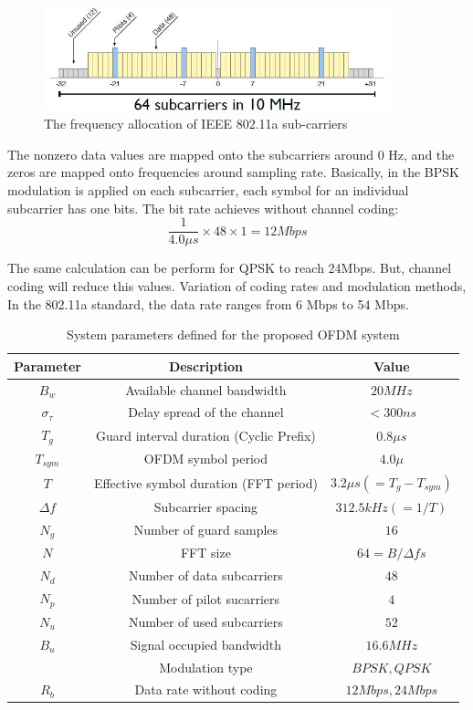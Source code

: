 \begin{figure}[h!]
\centering
\includegraphics[width=10cm]{content/fig/freq_alloc.JPG}
\caption{The frequency allocation of IEEE 802.11a sub-carriers}
\label{fig:freq_alloc}
\end{figure}

The nonzero data values are mapped onto the subcarriers around 0 Hz, and the zeros are mapped onto frequencies around sampling rate.
Basically, in the BPSK modulation is applied on each subcarrier, each symbol for an individual subcarrier has one bits. The bit rate achieves without channel coding:\\

\begin{equation} \label{bitrate_achiv}
\frac{1}{4.0\mu s} \times 48 \times 1= 12Mbps
\end{equation}

The same calculation can be perform for QPSK to reach 24Mbps. But, channel coding will reduce this values. Variation of coding rates and modulation methods, In the 802.11a standard, the data rate ranges from 6 Mbps to 54 Mbps.\\

\begin{table}
\centering
\vspace{0.5cm}
\begin{tabular}{c|c|c}
Parameter&Description&Value\\ \hline
$B_{w}$&Available channel bandwidth&$20MHz$\\
$\sigma_{\tau}$&Delay spread of the channel& $<300 ns$\\
$T_{g}$&Guard interval duration (Cyclic Prefix)&$0.8\mu s$\\
$T_{sym}$&OFDM symbol period&$4.0\mu$\\
$T$&Effective symbol duration (FFT period)&$3.2\mu s (=T_{g}- T_{sym})$\\
$\Delta f$&Subcarrier spacing&$312.5kHz (=1/T)$\\
$N_{g}$&Number of guard samples&$16$\\
$N$&FFT size&$64= B/\Delta f s$\\
$N_{d}$&Number of data subcarriers&$48$\\
$N_{p}$&Number of pilot sucarriers&$4$\\
$N_{u}$&Number of used subcarriers&$52$\\
$B_{u}$&Signal occupied bandwidth&$16.6MHz$\\
&Modulation type&$BPSK, QPSK$\\
$R_{b}$&Data rate without coding&$12Mbps, 24Mbps$\\
\end{tabular}
\caption{System parameters defined for the proposed OFDM system}
\label{table:sys_param}
\end{table}


